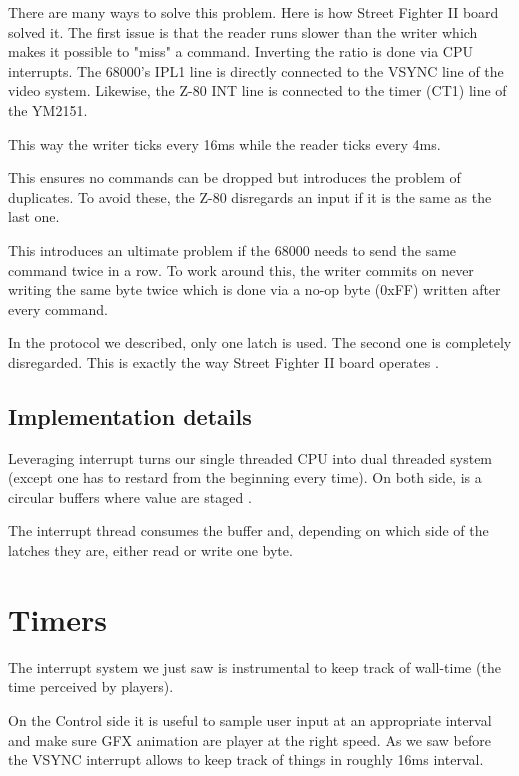 There are many ways to solve this problem. Here is how Street Fighter II board solved it. The first issue is that the reader runs slower than the writer which makes it possible to "miss" a command. Inverting the ratio is done via CPU interrupts. The 68000's IPL1 line is directly connected to the VSYNC line of the video system. Likewise, the Z-80 INT line is connected to the timer (CT1) line of the YM2151.


This way the writer ticks every 16ms while the reader ticks every 4ms. 


This ensures no commands can be dropped but introduces the problem of duplicates. To avoid these, the Z-80 disregards an input if it is the same as the last one.

This introduces an ultimate problem if the 68000 needs to send the same command twice in a row. To work around this, the writer commits on never writing the same byte twice which is done via a no-op byte (0xFF) written after every command.


\begin{trivia}
In the protocol we described, only one latch is used. The second one is completely disregarded. This is exactly the way Street Fighter II board operates	.
\end{trivia}

\subsection{Implementation details}
Leveraging interrupt turns our single threaded CPU into dual threaded system (except one has to restard from the beginning every time). On both side, is a circular buffers where value are staged	.

The interrupt thread consumes the buffer and, depending on which side of the latches they are, either read or write one byte.



\pagebreak


\section{Timers}
The interrupt system we just saw is instrumental to keep track of wall-time (the time perceived by players). 

On the Control side it is useful to sample user input at an appropriate interval and make sure GFX animation are player at the right speed. As we saw before the VSYNC interrupt allows to keep track of things in roughly 16ms interval.

